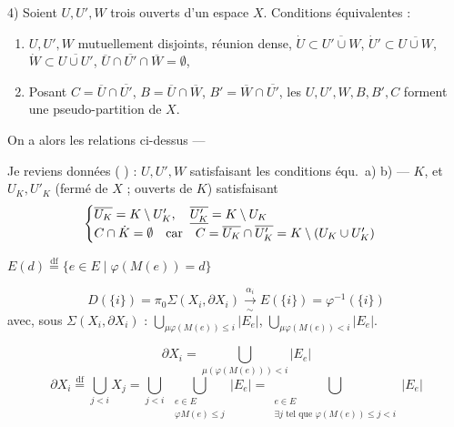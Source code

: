 \documentclass[11pt,a4paper]{article}
\begin{document}
4) \struck{\ill{}} Soient $U, U', W$ trois ouverts d'un espace $X$.
Conditions équivalentes :
\begin{enumerate}
\item[a)] $U, U', W$ mutuellement disjoints, réunion dense,
\struck{\ill{}} $\dot{U} \subset \overline{U' \cup W}$,
$\dot{U}' \subset \overline{U \cup W}$,
$\dot{W} \subset \overline{U \cup U'}$,
$\overline{U} \cap \overline{U'} \cap \overline{W} = \emptyset$,
\item[b)] Posant $C = \overline{U} \cap \overline{U'}$,
$B = \overline{U} \cap \overline{W}$, $B' = \overline{W} \cap \overline{U'}$,
les $U, U', W, B, B', C$ forment une pseudo-partition de $X$.
\end{enumerate}

On a alors les relations ci-dessus —

Je reviens \ill{} \ill{} données (\ill{} \ill{}) : $U, U', W$ satisfaisant
les conditions équ.\ a) b) — $K$, et $U_K, U'_K$ (fermé de $X$ ; ouverts de
$K$) satisfaisant
\[
\begin{cases}
\overline{U_K} = K \setminus U'_K, \quad \overline{\uncertain{U'_K}} = K \setminus U_K \\
C \cap \dot{K} = \emptyset \quad \text{car} \quad C = \overline{U_K} \cap \overline{U'_K} = K \setminus (U_K \cup U'_K)
\end{cases}
\]




$E(d) \overset{\mathrm{df}}{=} \{e \in E \mid \varphi(M(e)) = d\}$

\[
D(\{i\}) = \pi_0 \Sigma(X_i, \partial X_i) \xrightarrow[\sim]{\ \alpha_i\ } E(\{i\}) = \varphi^{-1}(\{i\})
\]
avec, sous $\Sigma(X_i, \partial X_i)$ :
$\bigcup_{\mu\varphi(M(e)) \leq i} |E_e|$,
$\bigcup_{\mu\varphi(M(e)) < i} |E_e|$.

\[
\partial X_i = \bigcup_{\mu(\varphi(M(e))) < i} |E_e|
\]
\[
\partial X_i \overset{\mathrm{df}}{=} \bigcup_{j < i} X_j
= \bigcup_{j < i}\ \bigcup_{\substack{e \in E \\ \varphi M(e) \leq j}} |E_e|
= \bigcup_{\substack{e \in E \\ \exists j \text{ tel que } \varphi(M(e)) \leq j < i}} |E_e|
\]
\end{document}
